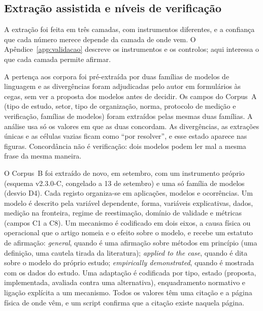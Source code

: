 \subsection{Extração assistida e níveis de verificação}
\label{sec:extracao-verificacao}

A extração foi feita em três camadas, com instrumentos diferentes, e a
confiança que cada número merece depende da camada de onde vem. O
Apêndice~\ref{app:validacao} descreve os instrumentos e os controlos;
aqui interessa o que cada camada permite afirmar.

A pertença aos corpora foi pré-extraída por duas famílias de modelos de
linguagem e as divergências foram adjudicadas pelo autor em formulários às
cegas, sem ver a proposta dos modelos antes de decidir.
Os campos do Corpus~A (tipo de estudo, setor, tipo de organização, norma,
protocolo de medição e verificação, famílias de modelos) foram extraídos
pelas mesmas duas famílias. A análise usa só os valores em que as duas
concordam. As divergências, as extrações únicas e as células vazias ficam
como ``por resolver'', e esse estado aparece nas figuras. Concordância não é
verificação: dois modelos podem ler mal a mesma frase da mesma maneira.

O Corpus~B foi extraído de novo, em setembro, com um instrumento próprio
(esquema v2.3.0-C, congelado a 13 de setembro) e uma só família de modelos
(desvio D4). Cada registo organiza-se em aplicações, modelos e ocorrências.
Um modelo é descrito pela variável dependente, forma, variáveis explicativas,
dados, medição na fronteira, regime de reestimação, domínio de validade e
métricas (campos C1 a C8). Um mecanismo é codificado em dois eixos, a causa
física ou operacional que o artigo nomeia e o efeito sobre o modelo, e
recebe um estatuto de afirmação: \emph{general}, quando é uma afirmação
sobre métodos em princípio (uma definição, uma cautela tirada da
literatura); \emph{applied to the case}, quando é dita sobre o modelo do
próprio estudo; \emph{empirically demonstrated}, quando é mostrada com os
dados do estudo. Uma adaptação é codificada por tipo, estado (proposta,
implementada, avaliada contra uma alternativa), enquadramento normativo e
ligação explícita a um mecanismo. Todos os valores têm uma citação e a
página física de onde vêm, e um script confirma que a citação existe
naquela página.

